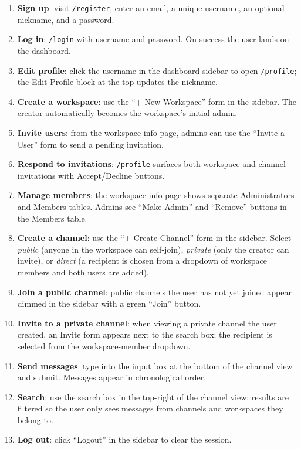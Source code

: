 \documentclass[11pt,letterpaper]{article}
\begin{document}
\begin{enumerate}[leftmargin=1.4em,itemsep=1pt]
  \item \textbf{Sign up}: visit \texttt{/register}, enter an email, a unique
        username, an optional nickname, and a password.
  \item \textbf{Log in}: \texttt{/login} with username and password. On
        success the user lands on the dashboard.
  \item \textbf{Edit profile}: click the username in the dashboard sidebar
        to open \texttt{/profile}; the Edit Profile block at the top updates
        the nickname.
  \item \textbf{Create a workspace}: use the ``+ New Workspace'' form in the
        sidebar. The creator automatically becomes the workspace's initial
        admin.
  \item \textbf{Invite users}: from the workspace info page, admins can use
        the ``Invite a User'' form to send a pending invitation.
  \item \textbf{Respond to invitations}: \texttt{/profile} surfaces both
        workspace and channel invitations with Accept/Decline buttons.
  \item \textbf{Manage members}: the workspace info page shows separate
        Administrators and Members tables. Admins see ``Make Admin'' and
        ``Remove'' buttons in the Members table.
  \item \textbf{Create a channel}: use the ``+ Create Channel'' form in the
        sidebar. Select \emph{public} (anyone in the workspace can self-join),
        \emph{private} (only the creator can invite), or \emph{direct}
        (a recipient is chosen from a dropdown of workspace members and both
        users are added).
  \item \textbf{Join a public channel}: public channels the user has not yet
        joined appear dimmed in the sidebar with a green ``Join'' button.
  \item \textbf{Invite to a private channel}: when viewing a private channel
        the user created, an Invite form appears next to the search box;
        the recipient is selected from the workspace-member dropdown.
  \item \textbf{Send messages}: type into the input box at the bottom of the
        channel view and submit. Messages appear in chronological order.
  \item \textbf{Search}: use the search box in the top-right of the channel
        view; results are filtered so the user only sees messages from
        channels and workspaces they belong to.
  \item \textbf{Log out}: click ``Logout'' in the sidebar to clear the
        session.
\end{enumerate}
\end{document}

